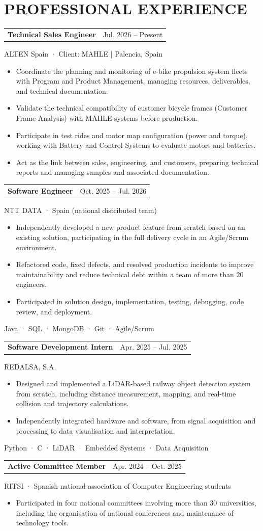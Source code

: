 \documentclass[10pt,a4paper]{article}
\makeatletter
\newcommand{\entry}[3]{\noindent\begin{tabularx}{\linewidth}{@{}Xr@{}}\textbf{#1}&{\small\color{muted}#2}\end{tabularx}\par{\small\color{muted}#3}\par}
\makeatother
\begin{document}
\section*{PROFESSIONAL EXPERIENCE}
\entry{Technical Sales Engineer}{Jul. 2026 -- Present}{ALTEN Spain · Client: MAHLE | Palencia, Spain}
\begin{itemize}
\item Coordinate the planning and monitoring of e-bike propulsion system fleets with Program and Product Management, managing resources, deliverables, and technical documentation.
\item Validate the technical compatibility of customer bicycle frames (Customer Frame Analysis) with MAHLE systems before production.
\item Participate in test rides and motor map configuration (power and torque), working with Battery and Control Systems to evaluate motors and batteries.
\item Act as the link between sales, engineering, and customers, preparing technical reports and managing samples and associated documentation.
\end{itemize}
\entry{Software Engineer}{Oct. 2025 -- Jul. 2026}{NTT DATA · Spain (national distributed team)}
\begin{itemize}
\item Independently developed a new product feature from scratch based on an existing solution, participating in the full delivery cycle in an Agile/Scrum environment.
\item Refactored code, fixed defects, and resolved production incidents to improve maintainability and reduce technical debt within a team of more than 20 engineers.
\item Participated in solution design, implementation, testing, debugging, code review, and deployment.
\end{itemize}
{\small\color{muted} Java · SQL · MongoDB · Git · Agile/Scrum}\par\vspace{4pt}
\entry{Software Development Intern}{Apr. 2025 -- Jul. 2025}{REDALSA, S.A.}
\begin{itemize}
\item Designed and implemented a LiDAR-based railway object detection system from scratch, including distance measurement, mapping, and real-time collision and trajectory calculations.
\item Independently integrated hardware and software, from signal acquisition and processing to data visualisation and interpretation.
\end{itemize}
{\small\color{muted} Python · C · LiDAR · Embedded Systems · Data Acquisition}\par\vspace{4pt}
\entry{Active Committee Member}{Apr. 2024 -- Oct. 2025}{RITSI · Spanish national association of Computer Engineering students}
\begin{itemize}
\item Participated in four national committees involving more than 30 universities, including the organisation of national conferences and maintenance of technology tools.
\end{itemize}
\end{document}
